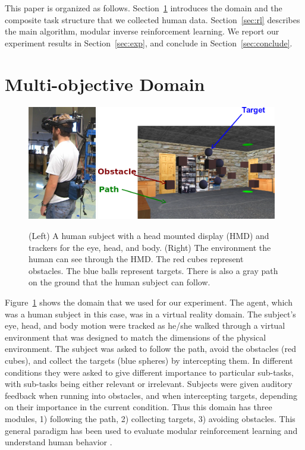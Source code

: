 \documentclass[11pt]{article} %
\begin{document}
This paper is organized as follows. Section~\ref{sec:domain} introduces the
domain and the composite task structure that we collected human data. Section~\ref{sec:rl}
describes the main algorithm, modular inverse reinforcement learning. We report
our experiment results in Section~\ref{sec:exp}, and conclude in
Section~\ref{sec:conclude}.

\section{Multi-objective Domain}
\label{sec:domain}

\begin{figure}[h!]
\centering
\includegraphics[height=5cm]{human.jpg}
\includegraphics[height=5cm]{env.png}
\caption{(Left) A human subject with a head mounted display (HMD) and trackers
for the eye, head, and body.  (Right) The environment the human can see through
the HMD.  The red cubes represent obstacles. The blue balls represent targets.
There is also a gray path on the ground that the human subject can follow.}
\label{fig:avatar}
\end{figure}

Figure~\ref{fig:avatar} shows the domain that we used for our experiment. The
agent, which was a human subject in this case, was in a virtual reality domain.
The subject's eye, head, and body motion were tracked as he/she walked through a
virtual environment that was designed to match the dimensions of the physical
environment. The subject was asked to follow the path, avoid the obstacles (red
cubes), and collect the targets (blue spheres) by intercepting them. In
different conditions they were asked to give different importance to particular
sub-tasks, with sub-tasks being either relevant or irrelevant. Subjects were
given auditory feedback when running into obstacles, and when intercepting
targets, depending on their importance in the current condition. Thus this
domain has three modules, 1) following the path, 2) collecting targets, 3)
avoiding obstacles.  This general paradigm has been used to evaluate modular
reinforcement learning \cite{rothkopf2013modular} and understand human behavior
\cite{Tong2014}.
\end{document}
